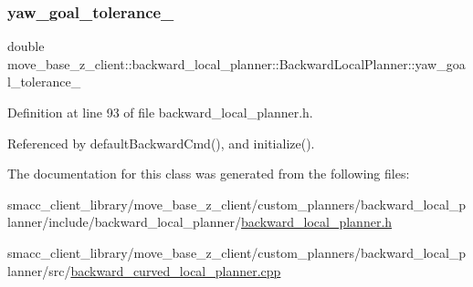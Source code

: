 \subsubsection{\texorpdfstring{yaw\+\_\+goal\+\_\+tolerance\+\_\+}{yaw\_goal\_tolerance\_}}
{\footnotesize\ttfamily double move\+\_\+base\+\_\+z\+\_\+client\+::backward\+\_\+local\+\_\+planner\+::\+Backward\+Local\+Planner\+::yaw\+\_\+goal\+\_\+tolerance\+\_\+\hspace{0.3cm}{\ttfamily [private]}}



Definition at line 93 of file backward\+\_\+local\+\_\+planner.\+h.



Referenced by default\+Backward\+Cmd(), and initialize().



The documentation for this class was generated from the following files\+:\begin{DoxyCompactItemize}
\item 
smacc\+\_\+client\+\_\+library/move\+\_\+base\+\_\+z\+\_\+client/custom\+\_\+planners/backward\+\_\+local\+\_\+planner/include/backward\+\_\+local\+\_\+planner/\hyperlink{backward__local__planner_8h}{backward\+\_\+local\+\_\+planner.\+h}\item 
smacc\+\_\+client\+\_\+library/move\+\_\+base\+\_\+z\+\_\+client/custom\+\_\+planners/backward\+\_\+local\+\_\+planner/src/\hyperlink{backward__curved__local__planner_8cpp}{backward\+\_\+curved\+\_\+local\+\_\+planner.\+cpp}\end{DoxyCompactItemize}
